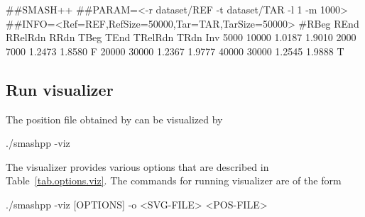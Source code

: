 \documentclass[a4paper,9pt]{extarticle}
\newcommand*{\method}[1]{\text{#1}\xspace}
\newcommand*{\smashpp}   {\method{Smash++}}
\begin{document}
\begin{code}[style=bash]
##SMASH++
##PARAM=<-r dataset/REF -t dataset/TAR -l 1 -m 1000>
##INFO=<Ref=REF,RefSize=50000,Tar=TAR,TarSize=50000>
#RBeg  REnd   RRelRdn  RRdn    TBeg   TEnd   TRelRdn  TRdn    Inv
5000   10000  1.0187   1.9010  2000   7000   1.2473   1.8580  F
20000  30000  1.2367   1.9777  40000  30000  1.2545   1.9888  T
\end{code}

\subsection{Run visualizer}
The position file obtained by \smashpp can be visualized by
\begin{code}[style=bash]
./smashpp -viz
\end{code}
The visualizer provides various options that are described in Table~\ref{tab.options.viz}. The commands for running \smashpp visualizer are of the form
\begin{code}[style=bash]
./smashpp -viz [OPTIONS]  -o <SVG-FILE>  <POS-FILE>
\end{code}
\end{document}
